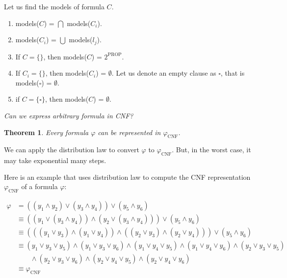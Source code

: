 \documentclass{article}
\newtheorem{theorem}{Theorem}
\begin{document}
Let us find the models of formula $C$.
\begin{enumerate}
	\item models($C$) = $\bigcap$ models($C_i$).
	\item models($C_i$) = $\bigcup$ models($l_j$).
	\item If $C = \{\}$, then models($C$) = $2^{\text{PROP}}$.
	\item If $C_{i} = \{\}$, then models($C_i$) = $\emptyset$. Let us denote an empty clause as $\square$, that is models($\square$) = $\emptyset$.
	\item if $C = \{ \square\}$, then  models($C$) = $\emptyset$.

\end{enumerate}

\textit{Can we express arbitrary formula in CNF?}
\begin{theorem}
Every formula $\varphi$ can be represented in $\varphi_{\text{CNF}}$.
\end{theorem}

We can apply the distribution law to convert $\varphi$ to $\varphi_{\text{CNF}}$. But, in the worst case, it may take exponential many steps.

Here is an example that uses distribution law to compute the CNF representation $\varphi_{\text{CNF}}$ of a formula $\varphi$:

\begin{align*}
\varphi &= ((y_1 \land y_2) \lor (y_3 \land y_4)) \lor (y_5 \land y_6)\\
		&\equiv ((y_1 \lor (y_3 \land y_4))  \land (y_2 \lor (y_3 \land y_4))) \lor (y_5 \land y_6)\\
		&\equiv (((y_1 \lor y_3) \land (y_1 \lor y_4))  \land ((y_2 \lor y_3) \land (y_2 \lor y_4))) \lor (y_5 \land y_6)\\
		&\equiv (y_1 \lor y_3 \lor y_5)  \land (y_1 \lor y_3 \lor y_6) \land (y_1 \lor y_4 \lor y_5)  \land (y_1 \lor y_4 \lor y_6) \land (y_2 \lor y_3 \lor y_5)  \\
		& \quad \quad \land (y_2 \lor y_3 \lor y_6) \land (y_2 \lor y_4 \lor y_5)  \land (y_2 \lor y_4 \lor y_6) \\
		&\equiv \varphi_{\text{CNF}}
\end{align*}
\end{document}
